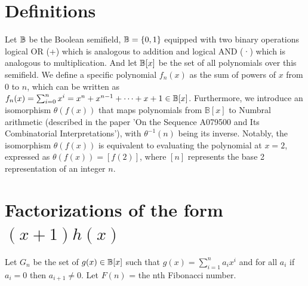     \section{Definitions}
        Let $\mathbb{B}$ be the Boolean semifield, $\mathbb{B} = \{0, 1\}$  equipped with two binary operations logical OR (+) which is analogous to addition and logical AND (·)
        which is analogous to multiplication. And let $\mathbb{B}[x]$ be the set of all polynomials over this semifield.
        We define a specific polynomial $f_n(x)$ as the sum of powers of $x$ from $0$ to $n$, which can be written as 
            $f_n(x) = \sum_{i=0}^n x^i = x^n + x^{n-1} + \dots + x + 1 \in \mathbb{B}[x]$.
        Furthermore, we introduce an isomorphism $\theta(f(x))$ that maps polynomials from $\mathbb{B}[x]$ to Numbral arithmetic
        (described in the paper 'On the Sequence A079500 and Its Combinatorial Interpretations'),
        with $\theta^{-1}(n)$ being its inverse. Notably, the isomorphism $\theta(f(x))$ is equivalent to evaluating the polynomial at $x=2$,
        expressed as $\theta(f(x)) = [f(2)]$, where $[n]$ represents the base 2 representation of an integer $n$.

    \section{Factorizations of the form $(x+1)h(x)$}
        Let $G_n$ be the set of $g(x) \in \mathbb{B}[x]$ such that $g(x) = \sum_{i=1}^n a_ix^i$
        and for all $a_i$ if $a_i = 0$ then $a_{i+1}\neq 0$.
        Let $F(n)$ = the nth Fibonacci number.

